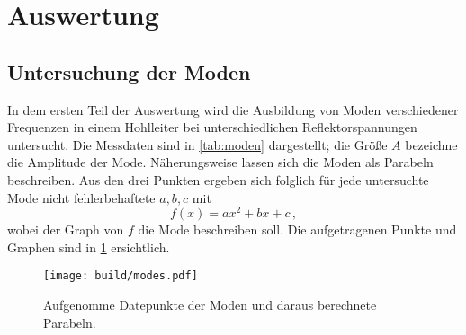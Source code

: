 \section{Auswertung}
\label{sec:Auswertung}

\subsection{Untersuchung der Moden}
In dem ersten Teil der Auswertung wird die Ausbildung von Moden verschiedener Frequenzen in einem Hohlleiter bei unterschiedlichen Reflektorspannungen untersucht. Die Messdaten sind in \ref{tab:moden} dargestellt; die Größe $A$ bezeichne die Amplitude der Mode. Näherungsweise lassen sich die Moden als Parabeln beschreiben. Aus den drei Punkten ergeben sich folglich für jede untersuchte Mode nicht fehlerbehaftete $a, b, c$ mit
\begin{equation}
  f(x) = ax^2 + bx + c\,,
\end{equation}
wobei der Graph von $f$ die Mode beschreiben soll.
Die aufgetragenen Punkte und Graphen sind in \ref{fig:moden} ersichtlich.

\begin{figure}
  \centering
  \texttt{[image: build/modes.pdf]}
  \caption{Aufgenomme Datepunkte der Moden und daraus berechnete Parabeln.}
  \label{fig:moden}
\end{figure}
